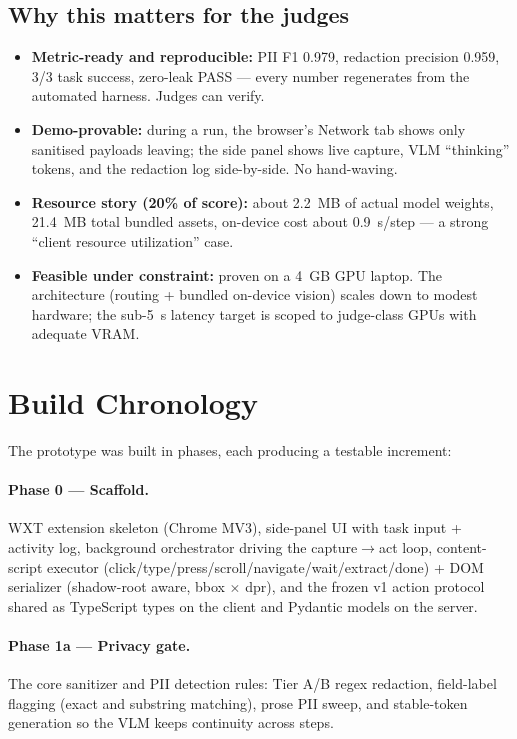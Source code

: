 \documentclass[11pt,a4paper]{article}
\begin{document}
\subsection{Why this matters for the judges}
\begin{itemize}
  \item \textbf{Metric-ready and reproducible:} PII F1 0.979, redaction precision 0.959, 3/3 task success, zero-leak PASS --- every number regenerates from the automated harness. Judges can verify.
  \item \textbf{Demo-provable:} during a run, the browser's Network tab shows only sanitised payloads leaving; the side panel shows live capture, VLM ``thinking'' tokens, and the redaction log side-by-side. No hand-waving.
  \item \textbf{Resource story (20\% of score):} about 2.2~MB of actual model weights, 21.4~MB total bundled assets, on-device cost about 0.9~s/step --- a strong ``client resource utilization'' case.
  \item \textbf{Feasible under constraint:} proven on a 4~GB GPU laptop. The architecture (routing + bundled on-device vision) scales down to modest hardware; the sub-5~s latency target is scoped to judge-class GPUs with adequate VRAM.
\end{itemize}

\section{Build Chronology}

The prototype was built in phases, each producing a testable increment:

\paragraph{Phase 0 --- Scaffold.}
WXT extension skeleton (Chrome MV3), side-panel UI with task input + activity log, background orchestrator driving the capture$\rightarrow$act loop, content-script executor (click/type/press/scroll/navigate/wait/extract/done) + DOM serializer (shadow-root aware, bbox $\times$ dpr), and the frozen v1 action protocol shared as TypeScript types on the client and Pydantic models on the server.

\paragraph{Phase 1a --- Privacy gate.}
The core sanitizer and PII detection rules: Tier A/B regex redaction, field-label flagging (exact and substring matching), prose PII sweep, and stable-token generation so the VLM keeps continuity across steps.
\end{document}
